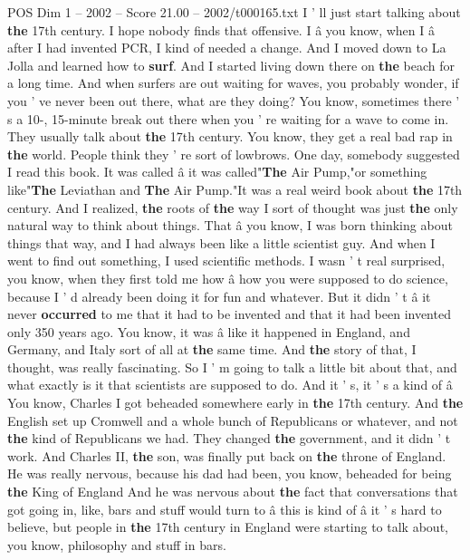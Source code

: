 \begin{textsample}{POS Dim 1 – 2002 – Score 21.00 – 2002/t000165.txt}  \label{ex:f1_pos_018}
I ' ll just start talking about \textbf{the} 17th century.
I hope nobody finds that offensive.
I â you know, when I â after I had invented PCR, I kind of needed a change.
And I moved down to La Jolla and learned how to \textbf{surf}.
And I started living down there on \textbf{the} beach for a long time.
And when surfers are out waiting for waves, you probably wonder, if you ' ve never been out there, what are they doing?
You know, sometimes there ' s a 10-, 15-minute break out there when you ' re waiting for a wave to come in.
They usually talk about \textbf{the} 17th century.
You know, they get a real bad rap in \textbf{the} world.
People think they ' re sort of lowbrows.
One day, somebody suggested I read this book.
It was called â it was called"\textbf{The} Air Pump,"or something like"\textbf{The} Leviathan and \textbf{The} Air Pump."It was a real weird book about \textbf{the} 17th century.
And I realized, \textbf{the} roots of \textbf{the} way I sort of thought was just \textbf{the} only natural way to think about things.
That â you know, I was born thinking about things that way, and I had always been like a little scientist guy.
And when I went to find out something, I used scientific methods.
I wasn ' t real surprised, you know, when they first told me how â how you were supposed to do science, because I ' d already been doing it for fun and whatever.
But it didn ' t â it never \textbf{occurred} to me that it had to be invented and that it had been invented only 350 years ago.
You know, it was â like it happened in England, and Germany, and Italy sort of all at \textbf{the} same time.
And \textbf{the} story of that, I thought, was really fascinating.
So I ' m going to talk a little bit about that, and what exactly is it that scientists are supposed to do.
And it ' s, it ' s a kind of â You know, Charles I got beheaded somewhere early in \textbf{the} 17th century.
And \textbf{the} English set up Cromwell and a whole bunch of Republicans or whatever, and not \textbf{the} kind of Republicans we had.
They changed \textbf{the} government, and it didn ' t work.
And Charles II, \textbf{the} son, was finally put back on \textbf{the} throne of England.
He was really nervous, because his dad had been, you know, beheaded for being \textbf{the} King of England And he was nervous about \textbf{the} fact that conversations that got going in, like, bars and stuff would turn to â this is kind of â it ' s hard to believe, but people in \textbf{the} 17th century in England were starting to talk about, you know, philosophy and stuff in bars.

\end{textsample}
